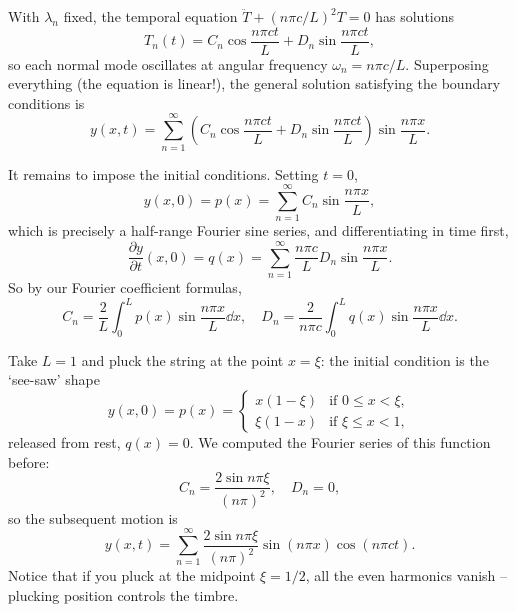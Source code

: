 \begin{center}
\end{center}

With $\lambda_n$ fixed, the temporal equation $\ddot{T} + (n \pi c/L)^2 T = 0$ has solutions
$$
T_n(t) = C_n \cos \frac{n \pi c t}{L} + D_n \sin \frac{n \pi c t}{L},
$$
so each normal mode oscillates at angular frequency $\omega_n = n \pi c /L$. Superposing everything (the equation is linear!), the general solution satisfying the boundary conditions is
$$
y(x, t) = \sum_{n = 1}^{\infty} \left(C_n \cos \frac{n \pi c t}{L} + D_n \sin \frac{n \pi c t}{L}\right) \sin \frac{n \pi x }{L}.
$$

It remains to impose the initial conditions. Setting $t = 0$,
$$
y(x, 0) = p(x) = \sum_{n = 1}^{\infty} C_n \sin \frac{n \pi x}{L},
$$
which is precisely a half-range Fourier sine series, and differentiating in time first,
$$
\frac{\partial y}{\partial t}(x, 0) = q(x) = \sum_{n = 1}^{\infty} \frac{n \pi c}{L} D_n \sin \frac{n \pi x}{L}.
$$
So by our Fourier coefficient formulas,
$$
C_n = \frac{2}{L} \int_0^L p(x) \sin \frac{n \pi x}{L} \dd x, \quad D_n = \frac{2}{n \pi c} \int_0^L q(x) \sin \frac{n \pi x}{L} \dd x.
$$

\begin{example}
    Take $L = 1$ and pluck the string at the point $x = \xi$: the initial condition is the `see-saw' shape
    $$
    y(x, 0) = p(x) = \begin{cases}
        x (1 - \xi) &\mbox{if } 0 \leq x < \xi, \\
        \xi (1 - x) &\mbox{if } \xi \leq x < 1,
    \end{cases}
    $$
    released from rest, $q(x) = 0$. We computed the Fourier series of this function before:
    $$
    C_n = \frac{2 \sin n \pi \xi}{(n \pi)^2}, \quad D_n = 0,
    $$
    so the subsequent motion is
    $$
    y(x, t) = \sum_{n = 1}^{\infty} \frac{2 \sin n \pi \xi}{(n \pi)^2} \sin (n \pi x) \cos( n \pi c t).
    $$
    Notice that if you pluck at the midpoint $\xi = 1/2$, all the even harmonics vanish -- plucking position controls the timbre.
\end{example}

